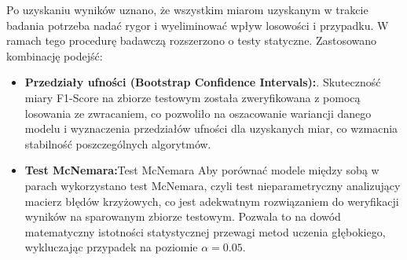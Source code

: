 \documentclass[a4paper,twoside,12pt]{book}
\begin{document}
Po uzyskaniu wyników uznano, że wszystkim miarom uzyskanym w trakcie badania potrzeba nadać rygor i wyeliminować wpływ losowości i przypadku. W ramach tego procedurę badawczą rozszerzono o testy statyczne. Zastosowano kombinację podejść:
\begin{itemize}
\item \textbf{Przedziały ufności (Bootstrap Confidence Intervals):}. Skuteczność miary F1-Score na zbiorze testowym została zweryfikowana z pomocą losowania ze zwracaniem, co pozwoliło na oszacowanie wariancji danego modelu i wyznaczenia przedziałów ufności dla uzyskanych miar, co wzmacnia stabilność poszczególnych algorytmów.
\item \textbf{Test McNemara:}Test McNemara Aby porównać modele między sobą w parach wykorzystano test McNemara, czyli test nieparametryczny analizujący macierz błędów krzyżowych, co jest adekwatnym rozwiązaniem do weryfikacji wyników na sparowanym zbiorze testowym. Pozwala to na dowód matematyczny istotności statystycznej przewagi metod uczenia głębokiego, wykluczając przypadek na poziomie $\alpha = 0.05$.
\end{itemize}

\end{document}
